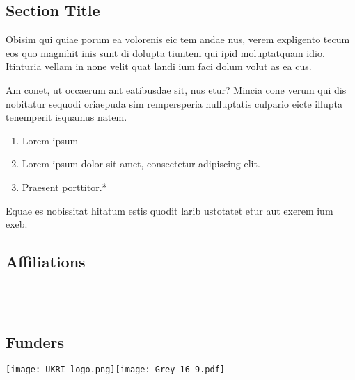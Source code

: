 \documentclass[
	landscape, %
]{ImperialPoster}
\begin{document}
\begin{multicols}{4}
	\section{Section Title}
	
	\begingroup
		\small %
		Obisim qui quiae porum ea volorenis eic tem andae nus, verem expligento tecum eos quo magnihit inis sunt di dolupta tiuntem qui ipid moluptatquam idio. Itinturia vellam in none velit quat landi ium faci dolum volut as ea cus.

		Am conet, ut occaerum ant eatibusdae sit, nus etur? Mincia cone verum qui dis nobitatur sequodi oriaepuda sim rempersperia nulluptatis culpario eicte illupta tenemperit isquamus natem.\par
	\endgroup
	
	
	\begin{enumerate}
		\item Lorem ipsum
		\item Lorem ipsum dolor sit amet, consectetur adipiscing elit.
		\item Praesent porttitor.*
	\end{enumerate}
	
		
	
	Equae es nobissitat hitatum estis quodit larib ustotatet etur aut exerem ium exeb.
	
	\subsection{Affiliations}
	
	\\
	\\
	
	\subsection{Funders}
	
	\texttt{[image: UKRI\_logo.png]}\hfill\texttt{[image: Grey\_16-9.pdf]} %
	

\end{multicols}

\end{document}
